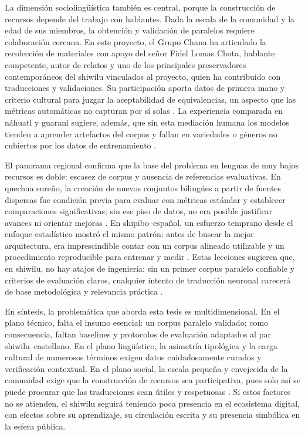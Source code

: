 \documentclass[12pt,a4paper,oneside]{book}
\begin{document}
La dimensión sociolingüística también es central, porque la construcción de recursos depende del trabajo con hablantes. Dada la escala de la comunidad y la edad de sus miembros, la obtención y validación de paralelos requiere colaboración cercana. En este proyecto, el Grupo Chana ha articulado la recolección de materiales con apoyo del señor Fidel Lomas Chota, hablante competente, autor de relatos y uno de los principales preservadores contemporáneos del shiwilu vinculados al proyecto, quien ha contribuido con traducciones y validaciones. Su participación aporta datos de primera mano y criterio cultural para juzgar la aceptabilidad de equivalencias, un aspecto que las métricas automáticas no capturan por sí solas \parencite{unesco2023}. La experiencia comparada en náhuatl y guaraní sugiere, además, que sin esta mediación humana los modelos tienden a aprender artefactos del corpus y fallan en variedades o géneros no cubiertos por los datos de entrenamiento \parencite{rios2019,baladon2024}.

El panorama regional confirma que la base del problema en lenguas de muy bajos recursos es doble: escasez de corpus y ausencia de referencias evaluativas. En quechua sureño, la creación de nuevos conjuntos bilingües a partir de fuentes dispersas fue condición previa para evaluar con métricas estándar y establecer comparaciones significativas; sin ese piso de datos, no era posible justificar avances ni orientar mejoras \parencite{chuquimamani2021}. En shipibo--español, un esfuerzo temprano desde el enfoque estadístico mostró el mismo patrón: antes de buscar la mejor arquitectura, era imprescindible contar con un corpus alineado utilizable y un procedimiento reproducible para entrenar y medir \parencite{galarreta2017}. Estas lecciones sugieren que, en shiwilu, no hay atajos de ingeniería: sin un primer corpus paralelo confiable y criterios de evaluación claros, cualquier intento de traducción neuronal carecerá de base metodológica y relevancia práctica \parencite{meque2023}.

En síntesis, la problemática que aborda esta tesis es multidimensional. En el plano técnico, falta el insumo esencial: un corpus paralelo validado; como consecuencia, faltan baselines y protocolos de evaluación adaptados al par shiwilu--castellano. En el plano lingüístico, la asimetría tipológica y la carga cultural de numerosos términos exigen datos cuidadosamente curados y verificación contextual. En el plano social, la escala pequeña y envejecida de la comunidad exige que la construcción de recursos sea participativa, pues solo así se puede procurar que las traducciones sean útiles y respetuosas \parencite{unesco2023}. Si estos factores no se atienden, el shiwilu seguirá teniendo poca presencia en el ecosistema digital, con efectos sobre su aprendizaje, su circulación escrita y su presencia simbólica en la esfera pública.
\end{document}
